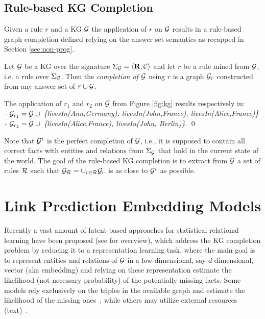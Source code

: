 \subsection{Rule-based KG Completion}

Given a rule $r$ and a KG $\mathcal{G}$ the application of $r$ on $\mathcal{G}$ results in a rule-based graph completion defined relying on the answer set semantics as recapped in Section \ref{sec:non-prog}.

\begin{definition}\label{def:graphcompl}
Let $\mathcal{G}$ be a KG over the signature $\Sigma_{\mathcal{G}}=\langle\mathbf{R},\mathcal{C}\rangle$ and let $r$ be a rule %
mined from $\mathcal{G}$, i.e. a rule over $\Sigma_{\mathcal{G}}$.
Then the \emph{completion of $\mathcal{G}$} using $r$ is a graph $\mathcal{G}_{r}$ constructed from any answer set of $r \cup \mathcal{G}$. 
\end{definition}

\begin{example}
The application of $r_1$ and $r_2$ on $\mathcal{G}$ from Figure \ref{fig:kg} results respectively in:\\
\textit{ - $\mathcal{G}_{r_1} = \mathcal{G}\;\cup$ \{livesIn(Ann,Germany), livesIn(John,France), livesIn(Alice,France)\}}\\
\textit{ - $\mathcal{G}_{r_2} = \mathcal{G}\;\cup$ \{livesIn(Alice,France), livesIn(John, Berlin)\}}. \qed
\end{example}

Note that $\mathcal{G}^i$ is the perfect completion of $\mathcal{G}$, i.e., it is supposed to contain all
correct facts with entities and relations from $\Sigma_{\mathcal{G}}$ that hold
in the current state of the world. The goal of the rule-based KG completion is to extract from $\mathcal{G}$ a set of rules $\mathcal{R}$ such that $\mathcal{G}_{\mathcal{R}} = \cup_{r\in \mathcal{R}}\mathcal{G}_{r}$ is as close to $ \mathcal{G}^i$ as possible.

\section{Link Prediction Embedding Models} 
Recently a vast amount of latent-based approaches for statistical relational learning have been proposed  (see \cite{Nickel0TG16} for overview), which address the KG completion problem by reducing it to a representation learning task, where the main goal is to represent entities and relations of $\mathcal{G}$ in a
low-dimensional, say $d$-dimensional, vector (aka embedding) and relying on these representation estimate the likelihood (not necessary probability) of the potentially missing facts. 
Some models rely exclusively on the triples in the available graph and estimate the likelihood of the missing ones~\cite{Bordes:NIPS2013,DBLP:conf/aaai/NickelRP16}, while others may utilize external resources (\eg text)~\cite{DBLP:conf/aaai/0005HMZ17}. 

